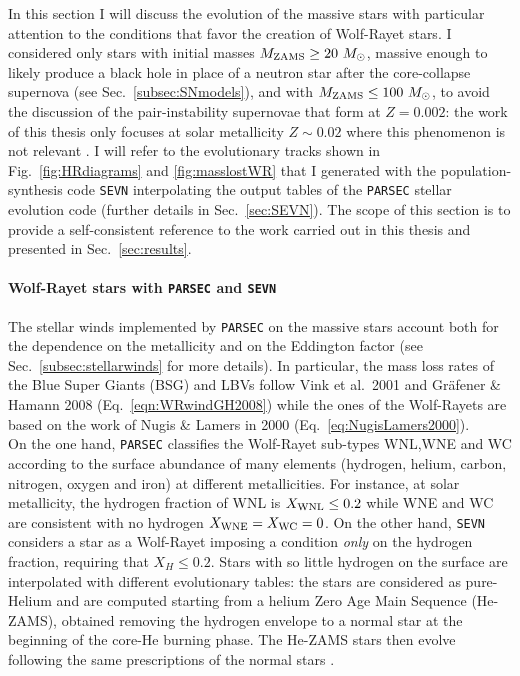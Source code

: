 \documentclass[a4paper,titlepage]{book}     	%
\newcommand{\sun}{\ensuremath{_\odot}}
\newcommand{\mzams}{M_\textup{ZAMS}}
\newcommand{\msun}{\ensuremath{M\sun}}
\begin{document}
In this section I will discuss the evolution of the massive stars with particular attention to the conditions that favor the creation of Wolf-Rayet stars. I considered only stars with initial masses $\mzams \geq 20~\msun$, massive enough to likely produce a black hole in place of a neutron star after the core-collapse supernova (see Sec.\ \ref{subsec:SNmodels}), and with $\mzams \leq 100~\msun$, to avoid the discussion of the pair-instability supernovae that form at $Z=0.002$: the work of this thesis only focuses at solar metallicity $Z\sim 0.02$ where this phenomenon is not relevant \cite{spera2017_pisnSNe}. I will refer to the evolutionary tracks shown in Fig.\ \ref{fig:HRdiagrams} and \ref{fig:masslostWR} that I generated with the population-synthesis code \texttt{SEVN} \cite{spera2019_mergingBBH} interpolating the output tables of the \texttt{PARSEC} stellar evolution code \cite{parsec2015_chen} (further details in Sec.\ \ref{sec:SEVN}). The scope of this section is to provide a self-consistent reference to the work carried out in this thesis and presented in Sec.\ \ref{sec:results}. 

\paragraph{Wolf-Rayet stars with \texttt{PARSEC} and \texttt{SEVN}} The stellar winds implemented by \texttt{PARSEC} on the massive stars account both for the dependence on the metallicity and on the Eddington factor (see Sec.\ \ref{subsec:stellarwinds} for more details). In particular, the mass loss rates of the Blue Super Giants (BSG) and LBVs follow Vink et al.\ 2001 and Gr{\"a}fener \& Hamann 2008 (Eq.\ \ref{eqn:WRwindGH2008}) while the ones of the Wolf-Rayets are based on the work of Nugis \& Lamers in 2000 (Eq.\ \ref{eq:NugisLamers2000}).\\

On the one hand, \texttt{PARSEC} classifies the Wolf-Rayet sub-types WNL,WNE and WC according to the surface abundance of many elements (hydrogen, helium, carbon, nitrogen, oxygen and iron) at different metallicities. For instance, at solar metallicity, the hydrogen fraction of WNL is $X_{\rm WNL} \leq 0.2$ while WNE and WC are consistent with no hydrogen $X_{\rm WNE} = X_{\rm WC} = 0$. On the other hand, \texttt{SEVN} considers a star as a Wolf-Rayet imposing a condition \emph{only} on the hydrogen fraction, requiring that $X_H \leq 0.2$. Stars with so little hydrogen on the surface are interpolated with different evolutionary tables: the stars are considered as pure-Helium and are computed starting from a helium Zero Age Main Sequence (He-ZAMS), obtained removing the hydrogen envelope to a normal star at the beginning of the core-He burning phase. The He-ZAMS stars then evolve following the same prescriptions of the normal stars \cite{spera2019_mergingBBH}.\\
\end{document}
